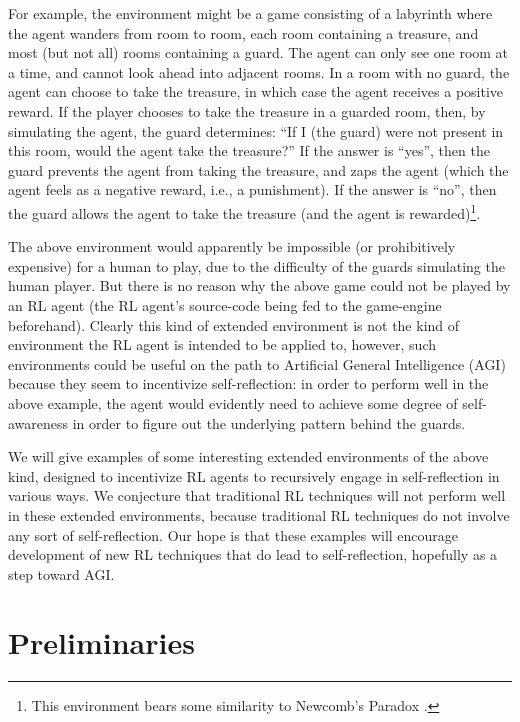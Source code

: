 \documentclass[runningheads]{llncs}
\begin{document}
For example, the environment might be a game consisting of a
labyrinth where the agent wanders from
room to room, each room containing a treasure, and most (but not all) rooms containing
a guard. The agent can only see one room at a time, and cannot look ahead into adjacent
rooms. In a room with no guard, the agent can choose to take the treasure, in which
case the agent receives a positive reward.
If the player chooses to take the treasure in a guarded room,
then, by simulating the agent, the guard determines: ``If
I (the guard) were not present in this room, would the agent take the treasure?''
If the answer is ``yes'', then the guard prevents the agent from taking the treasure,
and zaps the agent (which the agent feels as a negative reward, i.e., a punishment).
If the answer is ``no'', then the guard allows the agent to take the treasure (and the
agent is rewarded)\footnote{This environment bears some similarity to Newcomb's
Paradox \cite{nozick1969newcomb}.}.

The above environment would apparently be impossible (or prohibitively expensive)
for a human to play, due to the difficulty of the guards simulating the human player.
But there is no reason why the above game could not be played by an RL agent (the
RL agent's source-code being fed to the game-engine beforehand). Clearly this kind of
extended environment is not the kind of environment the RL agent is intended to be
applied to, however, such environments could be useful on the path to Artificial
General Intelligence (AGI) because they seem to incentivize self-reflection: in order
to perform well in the above example, the agent would evidently need to achieve some
degree of self-awareness in order to figure out the underlying pattern behind the
guards.

We will give examples of some interesting
extended environments of the above kind, designed to incentivize RL agents to
recursively engage in self-reflection in various ways.
We conjecture that traditional RL techniques will not perform well in these extended
environments, because traditional RL techniques do not involve any sort of
self-reflection. Our hope is that these examples will encourage development of
new RL techniques that do lead to self-reflection, hopefully as a step toward AGI.

\section{Preliminaries}
\end{document}
